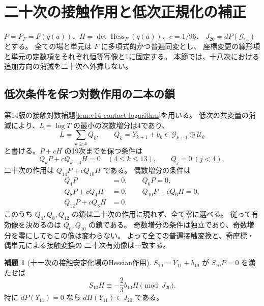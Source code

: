 \documentclass[a4paper,11pt]{ltjsarticle}
\theoremstyle{definition}
\newtheorem{lemma}[theorem]{補題}
\begin{document}



\section{二十次の接触作用と低次正規化の補正}
\label{sec:v15-contact-twentieth}

$P=P_F=F(q(a))$、$H=\det\operatorname{Hess}_F(q(a))$、$c=1/96$、
$J_{20}=dP(\mathcal G_{15})$ とする。
全ての場と単元は $F$ に多項式的かつ普遍同変とし、
座標変更の線形項と単元の定数項をそれぞれ恒等写像と1に固定する。
本節では、十八次における追加方向の消滅を二十次へ外挿しない。

\subsection{低次条件を保つ対数作用の二本の鎖}

第14版の接触対数補題\ref{lem:v14-contact-logarithm}を用いる。
低次の共変量の消滅により、$L=\log T$ の最小の次数増分は4であり、
\[
 L=\sum_{k\ge4}Q_k,\qquad
 Q_k=Y_{k+1}+b_k\in\mathcal G_{k+1}\oplus\mathcal U_k
\]
と書ける。$P+cH$ の19次までを保つ条件は
\[
 Q_kP+cQ_{k-4}H=0\quad(4\le k\le13),\qquad Q_j=0\ (j<4),
\]
二十次の作用は $Q_{14}P+cQ_{10}H$ である。
偶数増分の条件は
\begin{equation}\label{eq:v15-even-contact-chain}
 \begin{split}
 Q_4P&=0,\qquad Q_6P=0,\\
 Q_8P+cQ_4H&=0,\qquad Q_{10}P+cQ_6H=0,\\
 Q_{12}P+cQ_8H&=0.
 \end{split}
\end{equation}
このうち $Q_4,Q_8,Q_{12}$ の鎖は二十次の作用に現れず、全て零に選べる。
従って有効像を決めるのは $Q_6,Q_{10}$ の鎖である。
奇数増分の条件は独立であり、奇数増分を零にしてもこの像は変わらない。
よって全ての普遍接触変換と、奇座標・偶単元による接触変換の
二十次有効像は一致する。

\begin{lemma}[十一次の接触安定化場のHessian作用]
\label{lem:v15-eleventh-stabilizer-hessian}
$S_{10}=Y_{11}+b_{10}$ が $S_{10}P=0$ を満たせば
\[
 S_{10}H\equiv-\frac23b_{10}H\pmod{J_{20}}.
\]
特に $dP(Y_{11})=0$ なら $dH(Y_{11})\in J_{20}$ である。
\end{lemma}
\end{document}
